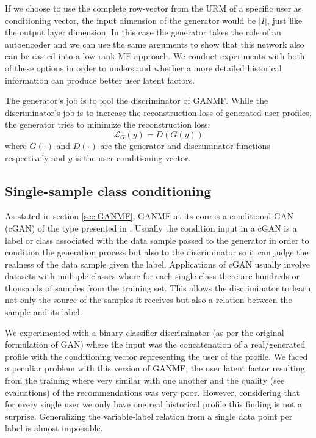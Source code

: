 If we choose to use the complete row-vector from the URM of a specific user as conditioning vector, the input dimension of the generator would be $|I|$, just like the output layer dimension. In this case the generator takes the role of an autoencoder and we can use the same arguments to show that this network also can be casted into a low-rank MF approach. We conduct experiments with both of these options in order to understand whether a more detailed historical information can produce better user latent factors.

The generator's job is to fool the discriminator of GANMF. While the discriminator's job is to increase the reconstruction loss of generated user profiles, the generator tries to minimize the reconstruction loss:
\begin{equation}
    \mathcal{L}_{G}(y) = D(G(y))
\end{equation}
where $G(\cdot)$ and $D(\cdot)$ are the generator and discriminator functions respectively and $y$ is the user conditioning vector.

\subsection{Single-sample class conditioning}
\label{sec:ss_class_conditioning}

As stated in section \ref{sec:GANMF}, GANMF at its core is a conditional GAN (cGAN) of the type presented in \cite{mirza2014conditional}. Usually the condition input in a cGAN is a label or class associated with the data sample passed to the generator in order to condition the generation process but also to the discriminator so it can judge the realness of the data sample given the label. Applications of cGAN usually involve datasets with multiple classes where for each single class there are hundreds or thousands of samples from the training set. This allows the discriminator to learn not only the source of the samples it receives but also a relation between the sample and its label.

We experimented with a binary classifier discriminator (as per the original formulation of GAN) where the input was the concatenation of a real/generated profile with the conditioning vector representing the user of the profile. We faced a peculiar problem with this version of GANMF; the user latent factor resulting from the training where very similar with one another and the quality (see evaluations) of the recommendations was very poor. However, considering that for every single user we only have one real historical profile this finding is not a surprise. Generalizing the variable-label relation from a single data point per label is almost impossible.

